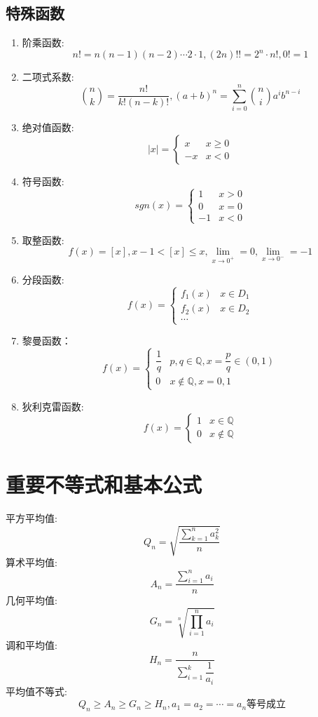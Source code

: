 \subsection{特殊函数}
\begin{definition}[特殊函数]
	\begin{enumerate}
		\item 阶乘函数: $$n!=n(n-1)(n-2)\cdots 2\cdot 1, (2n)!! = 2^{n}\cdot n!, 0! = 1$$
		\item 二项式系数: $$\binom{n}{k}=\dfrac{n!}{k!(n-k)!}, (a+b)^{n} = \sum\limits_{i = 0}^{n}\binom{n}{i}a^{i}b^{n-i}$$
		\item 绝对值函数: $$|x|=\begin{cases} x & x\geq 0 \\ -x & x<0 \end{cases}$$
		\item 符号函数: $$sgn(x)=\begin{cases} 1 & x>0 \\ 0 & x=0 \\ -1 & x<0 \end{cases}$$%
		\item 取整函数: $$f(x) = [x], x-1< [x] \leq x, \lim\limits_{x\to 0^{+}} = 0, \lim\limits_{x\to 0^{-}} =-1$$
		\item 分段函数: $$f(x)=\begin{cases} f_{1}(x) & x\in D_{1} \\ f_{2}(x) & x\in D_{2} \\ \cdots \end{cases}$$
		\item 黎曼函数：$$f(x)=\begin{cases} \dfrac{1}{q} & p,q\in \mathbb{Q}, x = \dfrac{p}{q}\in(0,1) \\ 0 & x\notin \mathbb{Q}, x=0,1 \end{cases}$$
		\item 狄利克雷函数: $$f(x)=\begin{cases} 1 & x\in \mathbb{Q} \\ 0 & x\notin \mathbb{Q} \end{cases}$$
	\end{enumerate}
\end{definition}


\section{重要不等式和基本公式}
\begin{theorem}[平均值不等式 $a_{i} > 0$]
	平方平均值:
	$$Q_{n}=\sqrt{\dfrac{\sum\limits_{k=1}^{n}a_{k}^{2}}{n}}$$
	算术平均值:
	$$A_{n}=\dfrac{\sum\limits_{i=1}^{n}a_{i}}{n}$$
	几何平均值:
	$$G_{n}=\sqrt[n]{\prod\limits_{i=1}^{n}a_{i}}$$
	调和平均值:
	$$H_{n}=\dfrac{n}{\sum\limits_{i=1}^{k}\dfrac{1}{a_{i}}}$$
	平均值不等式:
	$$Q_{n}\geq A_{n}\geq G_{n}\geq H_{n}, a_{1} = a_{2} = \cdots = a_{n} \text{等号成立}$$
\end{theorem}


